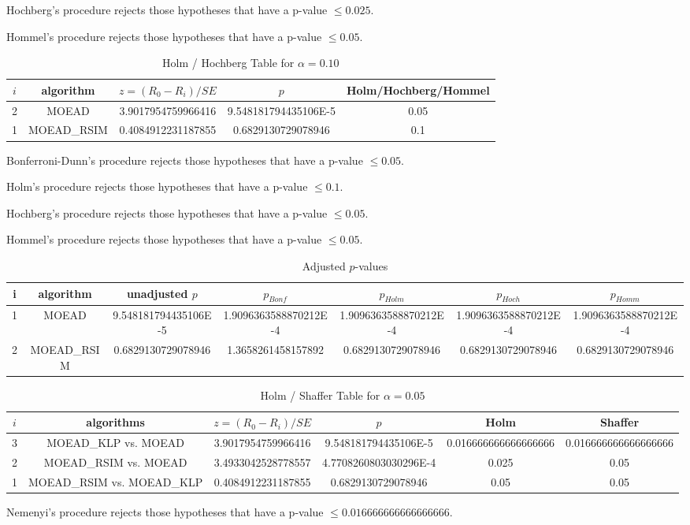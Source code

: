\documentclass[a4paper,10pt]{article}
\begin{document}
\begin{landscape}
Hochberg's procedure rejects those hypotheses that have a p-value $\le0.025$.


Hommel's procedure rejects those hypotheses that have a p-value $\le0.05$.


\begin{table}[!htp]
\centering\tiny
\caption{Holm / Hochberg Table for $\alpha=0.10$}
\begin{tabular}{ccccc}
$i$&algorithm&$z=(R_0 - R_i)/SE$&$p$&Holm/Hochberg/Hommel\\
\hline
2&MOEAD&3.9017954759966416&9.548181794435106E-5&0.05\\
1&MOEAD_RSIM&0.4084912231187855&0.6829130729078946&0.1\\
\hline
\end{tabular}
\end{table}
Bonferroni-Dunn's procedure rejects those hypotheses that have a p-value $\le0.05$.


Holm's procedure rejects those hypotheses that have a p-value $\le0.1$.


Hochberg's procedure rejects those hypotheses that have a p-value $\le0.05$.


Hommel's procedure rejects those hypotheses that have a p-value $\le0.05$.


\begin{table}[!htp]
\centering\tiny
\caption{Adjusted $p$-values}
\begin{tabular}{ccccccc}
i&algorithm&unadjusted $p$&$p_{Bonf}$&$p_{Holm}$&$p_{Hoch}$&$p_{Homm}$\\
\hline
1&MOEAD&9.548181794435106E-5&1.9096363588870212E-4&1.9096363588870212E-4&1.9096363588870212E-4&1.9096363588870212E-4\\
2&MOEAD_RSIM&0.6829130729078946&1.3658261458157892&0.6829130729078946&0.6829130729078946&0.6829130729078946\\
\hline
\end{tabular}
\end{table}

\begin{table}[!htp]
\centering\tiny
\caption{Holm / Shaffer Table for $\alpha=0.05$}
\begin{tabular}{cccccc}
$i$&algorithms&$z=(R_0 - R_i)/SE$&$p$&Holm&Shaffer\\
\hline
3&MOEAD_KLP vs. MOEAD&3.9017954759966416&9.548181794435106E-5&0.016666666666666666&0.016666666666666666\\
2&MOEAD_RSIM vs. MOEAD&3.4933042528778557&4.7708260803030296E-4&0.025&0.05\\
1&MOEAD_RSIM vs. MOEAD_KLP&0.4084912231187855&0.6829130729078946&0.05&0.05\\
\hline
\end{tabular}
\end{table}
Nemenyi's procedure rejects those hypotheses that have a p-value $\le0.016666666666666666$.



\end{landscape}
\end{document}
